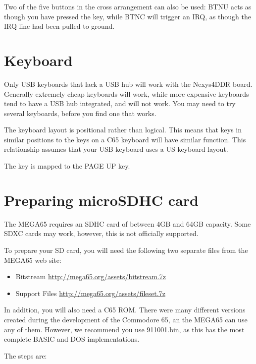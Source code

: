 Two of the five buttons in the cross arrangement can also be used:  BTNU acts as though you have pressed the  key, while BTNC will trigger an IRQ, as though the IRQ line had been pulled to ground.

\section{Keyboard}

Only USB keyboards that lack a USB hub will work with the Nexys4DDR board.  Generally extremely cheap keyboards will work, while more expensive keyboards tend to have a USB hub integrated, and will not work.  You may need to try several keyboards, before you find one that works.

The keyboard layout is positional rather than logical.
This means that keys in similar positions to the keys on a C65 keyboard will have similar function.
This relationship assumes that your USB keyboard uses a US keyboard layout.

The  key is mapped to the PAGE UP key.

\newpage

\section{Preparing microSDHC card}

The MEGA65 requires an SDHC card of between 4GB and 64GB capacity.  Some SDXC cards may work, however, this is not officially supported.

To prepare your SD card, you will need the following two separate files from the MEGA65 web site:

\begin{itemize}
\item{Bitstream} \url{http://mega65.org/assets/bitstream.7z}
\item{Support Files} \url{http://mega65.org/assets/fileset.7z}
\end{itemize}

In addition, you will also need a C65 ROM.  There were many different versions created during the development of the Commodore 65,
an the MEGA65 can use any of them.  However, we recommend you use 911001.bin, as this has the most complete BASIC and DOS implementations.

The steps are:

